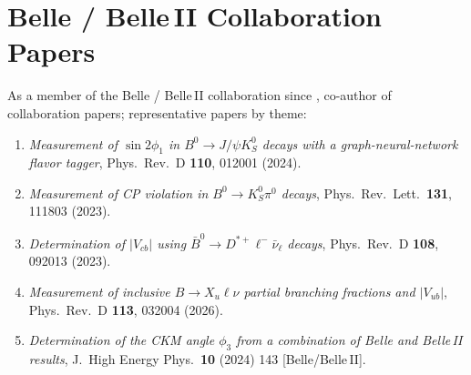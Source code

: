 \documentclass[a4paper,11pt,fontset=none]{ctexart}
\begin{document}
\section{Belle / Belle\,II Collaboration Papers}

{\small As a member of the Belle / Belle\,II collaboration since , co-author of  collaboration papers; representative papers by theme:}

{\small\setlength{\emergencystretch}{3em}

\smallskip
\noindent{}
\begin{enumerate}\setlength{\itemsep}{1.5pt}
  \item \textit{Measurement of $\sin 2\phi_{1}$ in $B^{0}\!\to J/\psi K_{S}^{0}$ decays with a graph-neural-network flavor tagger}, Phys.\ Rev.\ D \textbf{110}, 012001 (2024)\;[Belle\,II].
  \item \textit{Measurement of CP violation in $B^{0}\!\to K_{S}^{0}\pi^{0}$ decays}, Phys.\ Rev.\ Lett.\ \textbf{131}, 111803 (2023)\;[Belle\,II].
  \item \textit{Determination of $|V_{cb}|$ using $\bar{B}^{0}\!\to D^{*+}\ell^{-}\bar\nu_{\ell}$ decays}, Phys.\ Rev.\ D \textbf{108}, 092013 (2023)\;[Belle\,II].
  \item \textit{Measurement of inclusive $B\!\to X_{u}\ell\nu$ partial branching fractions and $|V_{ub}|$}, Phys.\ Rev.\ D \textbf{113}, 032004 (2026)\;[Belle\,II].
  \item \textit{Determination of the CKM angle $\phi_{3}$ from a combination of Belle and Belle\,II results}, J.\ High Energy Phys.\ \textbf{10} (2024) 143 [Belle/Belle\,II].
\end{enumerate}

}
\end{document}
